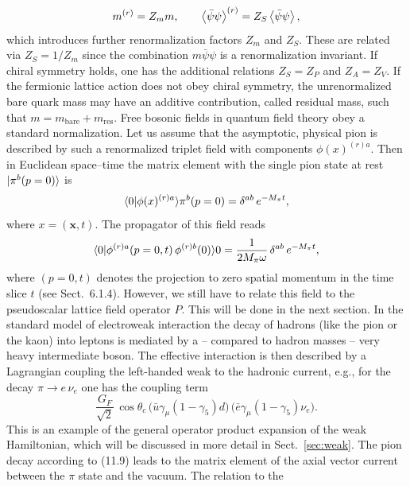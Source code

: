 \begin{equation}
m^{(r)} = Z_m m , \qquad
\left\langle \bar{\psi}\psi \right\rangle^{(r)} = Z_S \left\langle \bar{\psi}\psi \right\rangle ,
\end{equation}
which introduces further renormalization factors $Z_m$ and $Z_S$. These are related via $Z_S = 1/Z_m$ since the combination $m\bar{\psi}\psi$ is a renormalization invariant. If chiral symmetry holds, one has the additional relations $Z_S = Z_P$ and
$Z_A = Z_V$.
If the fermionic lattice action does not obey chiral symmetry, the unrenormalized bare quark mass may have an additive contribution, called residual
mass, such that $m = m_{\mathrm{bare}} + m_{\mathrm{res}}$.
Free bosonic fields in quantum field theory obey a standard normalization.
Let us assume that the asymptotic, physical pion is described by such a renormalized triplet field with components $\phi(x)^{(r)a}$. Then in Euclidean space--time
the matrix element with the single pion state at rest $|\pi^b(p = 0)\rangle$ is
\begin{equation}
\langle0|\phi(x)^{(r)a}\rangle{\pi^b(p = 0)} = \delta^{ab}\, e^{-M_\pi t} ,
\end{equation}
where $x = (\mathbf{x}, t)$. The propagator of this field reads
\begin{equation}
\langle0|\phi^{(r)a}(p = 0, t)\,\phi^{(r)b}(0)\rangle{0} =
\frac{1}{2M_\pi\omega}\,\delta^{ab}\, e^{-M_\pi t} ,
\end{equation}
where $(p = 0, t)$ denotes the projection to zero spatial momentum in the
time slice $t$ (see Sect.~6.1.4). However, we still have to relate this field to the
pseudoscalar lattice field operator $P$. This will be done in the next section.
In the standard model of electroweak interaction the decay of hadrons (like
the pion or the kaon) into leptons is mediated by a -- compared to hadron
masses -- very heavy intermediate boson. The effective interaction is then
described by a Lagrangian coupling the left-handed weak to the hadronic
current, e.g., for the decay $\pi \to e\,\nu_e$ one has the coupling term
\begin{equation}
\frac{G_F}{\sqrt{2}}\,\cos\theta_c\, \bigl(\bar{u}\gamma_\mu(1-\gamma_5)d\bigr)\,
\bigl(\bar{e}\gamma_\mu(1-\gamma_5)\nu_e\bigr) .
\end{equation}
This is an example of the general operator product expansion of the weak
Hamiltonian, which will be discussed in more detail in Sect.~\ref{sec:weak}.
The pion decay according to (11.9) leads to the matrix element of the
axial vector current between the $\pi$ state and the vacuum. The relation to the
